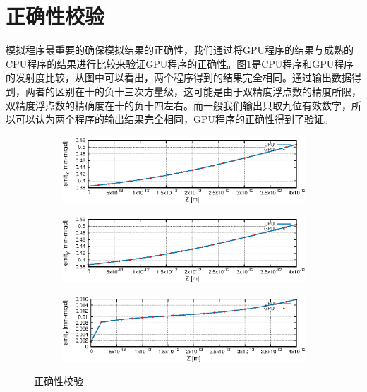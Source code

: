 \section{正确性校验}
模拟程序最重要的确保模拟结果的正确性，我们通过将GPU程序的结果与成熟的CPU程序的结果进行比较来验证GPU程序的正确性。图\ref{fig:PIC_GPU_benchmark}是CPU程序和GPU程序的发射度比较，从图中可以看出，两个程序得到的结果完全相同。通过输出数据得到，两者的区别在十的负十三次方量级，这可能是由于双精度浮点数的精度所限，双精度浮点数的精确度在十的负十四左右。而一般我们输出只取九位有效数字，所以可以认为两个程序的输出结果完全相同，GPU程序的正确性得到了验证。
\begin{figure}[!htb]
    \centering
    \begin{subfigure}[b]{0.9\textwidth}
        \includegraphics[width=\textwidth]{Img/PIC_GPU_benchmark_x.eps}
    \end{subfigure}
    \begin{subfigure}[b]{0.9\textwidth}
        \includegraphics[width=\textwidth]{Img/PIC_GPU_benchmark_y.eps}
    \end{subfigure}
    \begin{subfigure}[b]{0.9\textwidth}
        \includegraphics[width=\textwidth]{Img/PIC_GPU_benchmark_z.eps}
    \end{subfigure}
    \caption{正确性校验}\label{fig:PIC_GPU_benchmark}
\end{figure}

